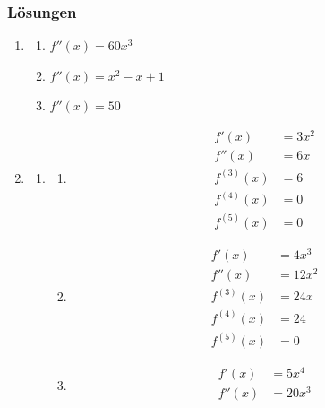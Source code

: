 \subsubsection*{Lösungen}
\begin{enumerate}
    \item
          \begin{enumerate}
              \item \( f''(x) = 60x^3 \)
              \item \( f''(x) = x^2 -x + 1 \)
              \item \( f''(x) = 50 \)
          \end{enumerate}

    \item
          \begin{enumerate}
              \item
                    \begin{enumerate}
                        \item
                              \begin{align*}
                                  f'(x)      & = 3x^2 \\
                                  f''(x)     & = 6x   \\
                                  f^{(3)}(x) & = 6    \\
                                  f^{(4)}(x) & = 0    \\
                                  f^{(5)}(x) & = 0
                              \end{align*}
                        \item
                              \begin{align*}
                                  f'(x)      & = 4x^3  \\
                                  f''(x)     & = 12x^2 \\
                                  f^{(3)}(x) & = 24x   \\
                                  f^{(4)}(x) & = 24    \\
                                  f^{(5)}(x) & = 0
                              \end{align*}
                        \item
                              \begin{align*}
                                  f'(x)      & = 5x^4  \\
                                  f''(x)     & = 20x^3 \\

\end{align*}
\end{enumerate}
\end{enumerate}
\end{enumerate}
